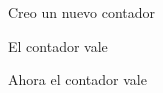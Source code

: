 \documentclass{article}
\begin{document}
Creo un nuevo contador

El contador vale \thecontador


Ahora el contador vale \thecontador
\end{document}
